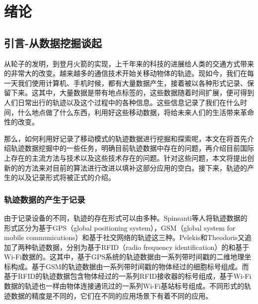 
\chapter{绪论}
\label{chapter:introduction}
\section{引言-从数据挖掘谈起}


从轮子的发明，到登月火箭的实现，上千年来的科技的进展给人类的交通方式带来的非常大的改变。越来越多的通信技术开始关移动物体的轨迹。现如今，我们在每一天我们使用计算机、手机时候，都有大量数据产生，接着被以各种形式记录、保留下来。这其中，大量数据是带有地点标签的，这些数据随着时间扩展，便可得到人们日常出行的轨迹以及这个过程中的各种信息。这些信息记录了我们在什么时间，什么地点做了什么东西，利用好这些移动数据，将给未来人们的生活带来革命性的改变。

那么，如何利用好记录了移动模式的轨迹数据进行挖掘和探索呢，本文在将首先介绍轨迹数据挖掘中的一些任务，明确目前轨迹数据中存在的问题，再介绍目前国际上存在的主流方法与技术以及这些技术存在的问题。针对这些问题，本文将提出创新的的方法来对目前的算法进行改进以填补这部分应用的空白。接下来，轨迹的产生的以及记录形式将被正式的介绍。

\subsection{轨迹数据的产生于记录}
由于记录设备的不同，轨迹的存在形式可以由多种。Spinsanti等人\cite{spinsanti2013mobility}将轨迹数据的形式区分为基于GPS（global positioning system），GSM（global system for mobile communications）和基于社交网络的轨迹这三种。Pelekis和Theodoris\cite{pelekis2014mobility}又追加了两种轨迹数据，分别为基于RFID（radio frequency identification）的和基于Wi-Fi数据的。这其中，基于GPS系统的轨迹数据由一系列带时间戳的二维地理坐标构成。基于GSM的轨迹数据由一系列带时间戳的物体经过的细胞标号组成。而基于RFID的轨迹数据包含物体经过的一系列RFID接收器的标号组成，基于Wi-Fi数据的轨迹也一样由物体连接通讯过的一系列Wi-Fi基站标号组成。不同形式的轨迹数据的精度是不同的，它们在不同的应用场景下有着不同的应用。

